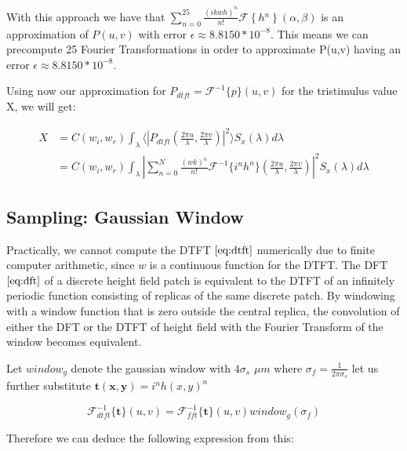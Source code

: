 With this approach we have that $\sum_{n=0}^{25}\frac{(ikwh)^{n}}{n!}\mathcal{F}\left\{ h{}^{n}\right\} (\alpha,\beta)$ is
an approximation of $P(u,v)$ with error $\epsilon\approx8.8150*10^{-8}$. This means we can precompute 25 Fourier Transformations in order to approximate P(u,v) having an error $\epsilon\approx8.8150*10^{-8}$. 

Using now our approximation for $P_{dtft} = \mathcal{F}^{-1}\{p\}(u,v)$ for the tristimulus value X, we will get:

\begin{align}
X 
& = C(w_i,w_r) \int_{\lambda} \langle \left|P_{dtft}(\frac{2\pi u}{\lambda}, \frac{2\pi v}{\lambda})\right|^2\rangle S_x(\lambda)d\lambda \nonumber \\
& = C(w_i,w_r) \int_{\lambda} \left| \sum_{n=0}^N \frac{(wk)^n}{n!} \mathcal{F}^{-1}\{i^n h^n\}(\frac{2\pi u}{\lambda}, \frac{2\pi v}{\lambda})\right|^2 S_x(\lambda)d\lambda
\label{eq:xcolexpression}
\end{align}

\subsection{Sampling: Gaussian Window}
\label{sec:gaussianwindow}
Practically, we cannot compute the DTFT $\ref{eq:dtft}$ numerically due to finite computer arithmetic, since $w$ is a continuous function for the DTFT. The DFT $\ref{eq:dft}$ of a discrete height field patch is equivalent to the DTFT of an infinitely periodic function consisting of replicas of the same discrete patch. By windowing with a window function that is zero outside the central replica, the convolution of either the DFT or the DTFT of height field with the Fourier Transform of the window becomes equivalent.

Let $window_g$ denote the gaussian window with $4\sigma_s$ $\mu m$ where $\sigma_f = \frac{1}{2\pi\sigma_s}$
let us further substitute $\mathbf{t(x,y)}=i^n h(x,y)^n$

\begin{equation}
\mathcal{F}_{dtft}^{-1}\{\mathbf{t}\}(u,v) = \mathcal{F}_{fft}^{-1}\{\mathbf{t}\}(u,v)window_g(\sigma_f)
\end{equation} 

Therefore we can deduce the following expression from this:

